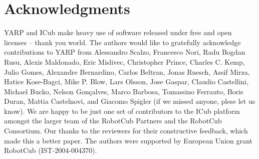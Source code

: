 
\section{Acknowledgments}

YARP and ICub make heavy use of software released under free and open
licenses -- thank you world.
%
The authors would like to gratefully acknowledge contributions to YARP
from Alessandro Scalzo, Francesco Nori, Radu Bogdan Rusu, 
Alexis Maldonado, Eric Mislivec, Christopher
Prince, Charles C. Kemp, Julio Gomes, Alexandre
Bernardino, Carlos Beltran, Jonas Ruesch, Assif Mirza, Hatice
Kose-Bagci, Mike P. Blow, Lars Olsson,
Jose Gaspar, Claudio Castellini, Michael Bucko, Nelson
Gon\c calves, Marco Barbosa, Tomassino Ferrauto, Boris Duran, Mattia
Castelnovi, and Giacomo Spigler 
 (if we missed anyone, plese let us
know).  
%
We are happy to be just one set of contributors to the ICub platform
amongst the larger team of the RobotCub Partners and the RobotCub
Consortium.
%
Our thanks to the reviewers for their constructive feedback, which
made this a better paper.
%
The authors were supported by European Union
grant RobotCub (IST-2004-004370).




